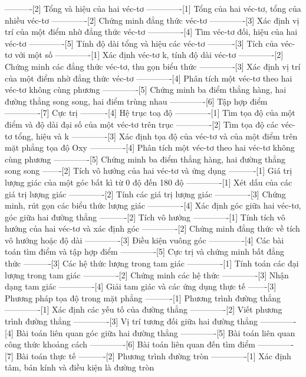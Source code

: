----------[2] Tổng và hiệu của hai véc-tơ
-------------[1] Tổng của hai véc-tơ, tổng của nhiều véc-tơ
-------------[2] Chứng minh đẳng thức véc-tơ
-------------[3] Xác định vị trí của một điểm nhờ đẳng thức véc-tơ
-------------[4] Tìm véc-tơ đối, hiệu của hai véc-tơ
-------------[5] Tính độ dài tổng và hiệu các véc-tơ
----------[3] Tích của véc-tơ với một số
-------------[1] Xác định véc-tơ k, tính độ dài véc-tơ
-------------[2] Chứng minh các đẳng thức véc-tơ, thu gọn biểu thức
-------------[3] Xác định vị trí của một điểm nhờ đẳng thức véc-tơ
-------------[4] Phân tích một véc-tơ theo hai véc-tơ không cùng phương
-------------[5] Chứng minh ba điểm thẳng hàng, hai đường thẳng song song, hai điểm trùng nhau
-------------[6] Tập hợp điểm
-------------[7] Cực trị
----------[4] Hệ trục toạ độ
-------------[1] Tìm tọa độ của một điểm và độ dài đại số của một véc-tơ trên trục
-------------[2] Tìm tọa độ các véc-tơ tổng, hiệu và k
-------------[3] Xác định tọa độ của véc-tơ và của một điểm trên mặt phẳng tọa độ Oxy
-------------[4] Phân tích một véc-tơ theo hai véc-tơ không cùng phương
-------------[5] Chứng minh ba điểm thẳng hàng, hai đường thẳng song song
-------[2] Tích vô hướng của hai véc-tơ và ứng dụng
----------[1] Giá trị lượng giác của một góc bất kì từ 0 độ đến 180 độ
-------------[1] Xét dấu của các giá trị lượng giác
-------------[2] Tính các giá trị lượng giác
-------------[3] Chứng minh, rút gọn các biểu thức lượng giác
-------------[4] Xác định góc giữa hai véc-tơ, góc giữa hai đường thẳng
----------[2] Tích vô hướng
-------------[1] Tính tích vô hướng của hai véc-tơ và xác định góc
-------------[2] Chứng minh đẳng thức về tích vô hướng hoặc độ dài
-------------[3] Điều kiện vuông góc
-------------[4] Các bài toán tìm điểm và tập hợp điểm
-------------[5] Cực trị và chứng minh bất đẳng thức
----------[3] Các hệ thức lượng trong tam giác
-------------[1] Tính toán các đại lượng trong tam giác
-------------[2] Chứng minh các hệ thức
-------------[3] Nhận dạng tam giác
-------------[4] Giải tam giác và các ứng dụng thực tế
-------[3] Phương pháp tọa độ trong mặt phẳng
----------[1] Phương trình đường thẳng
-------------[1] Xác định các yếu tố của đường thẳng
-------------[2] Viết phương trình đường thẳng
-------------[3] Vị trí tương đối giữa hai đường thẳng
-------------[4] Bài toán liên quan góc giữa hai đường thẳng
-------------[5] Bài toán liên quan công thức khoảng cách
-------------[6] Bài toán liên quan đến tìm điểm
-------------[7] Bài toán thực tế
----------[2] Phương trình đường tròn
-------------[1] Xác định tâm, bán kính và điều kiện là đường tròn
